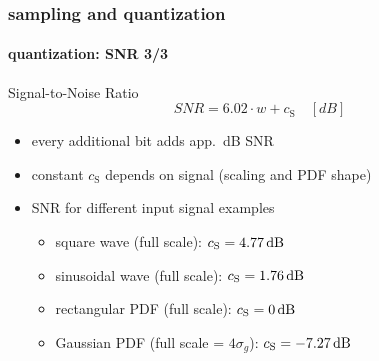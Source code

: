 	\begin{frame}\frametitle{sampling and quantization}\framesubtitle{quantization: SNR 3/3}
		\vspace{-5mm}\toremember{}
        \begin{block}{Signal-to-Noise Ratio}
			\centering
			\begin{equation*}
				SNR = 6.02\cdot w + c_{\mathrm{S}}\quad [dB]
			\end{equation*}
            \vspace{-2mm}
			\begin{itemize}
				\item	every additional bit adds app.\ \unit[6]{dB} SNR
				\item	constant $c_{\mathrm{S}}$ depends on signal (scaling and PDF shape)
			\end{itemize}
		\end{block}
        \pause
		\begin{itemize}
            \item[] SNR for different input signal examples
                \begin{itemize}
                    \item	square wave (full scale): $c_{\mathrm{S}} =  \unit[4.77]{dB}$
                    \item	sinusoidal wave (full scale): $c_{\mathrm{S}} =  \unit[1.76]{dB}$
                    \item	rectangular {PDF} (full scale): $c_{\mathrm{S}} =  \unit[0]{dB}$
                    \item	Gaussian {PDF} (full scale = $4\sigma_{g}$): $c_{\mathrm{S}} =  \unit[-7.27]{dB}$
                \end{itemize}
		\end{itemize}
	\end{frame}		
